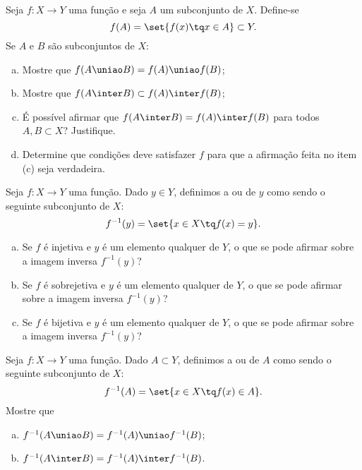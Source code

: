 \begin{exercise}
    Seja $f: X \to Y$ uma função e seja $A$ um subconjunto de $X$.
Define-se $$f(A) = \set{f(x) \tq x\in A} \subset Y.$$ Se $A$ e $B$
são subconjuntos de $X$:
\begin{enumerate}[(a)]
  \item Mostre que $f(A \uniao B) = f(A) \uniao f(B)$;
  \item Mostre que $f(A \inter B) \subset f(A) \inter f(B)$;
  \item É possível afirmar que $f(A \inter B) = f(A) \inter f(B)$ para
  todos $A, B \subset X$? Justifique.
  \item Determine que condições deve satisfazer $f$ para que a
  afirmação feita no item (c) seja verdadeira.
\end{enumerate}

\end{exercise}

\begin{exercise}
    Seja $f: X \to Y$ uma função. Dado $y \in Y$, definimos a
 ou  de $y$ como sendo o
seguinte subconjunto de $X$: $$ f^{-1}(y) = \set{x \in X \tq
f(x)=y}.$$
\begin{enumerate}[(a)]
  \item Se $f$ é injetiva e $y$ é um elemento qualquer de $Y$, o que
  se pode afirmar sobre a imagem inversa $f^{-1}(y)$?
  \item Se $f$ é sobrejetiva e $y$ é um elemento qualquer de $Y$, o que
  se pode afirmar sobre a imagem inversa $f^{-1}(y)$?
  \item Se $f$ é bijetiva e $y$ é um elemento qualquer de $Y$, o que
  se pode afirmar sobre a imagem inversa $f^{-1}(y)$?
\end{enumerate}
\end{exercise}

\begin{exercise}
    Seja $f: X \to Y$ uma função. Dado $A \subset Y$, definimos a
 ou  de $A$ como sendo o
seguinte subconjunto de $X$: $$ f^{-1}(A) = \set{x \in X \tq f(x)\in
A}.$$ Mostre que
\begin{enumerate}[(a)]
  \item $f^{-1} (A \uniao B) = f^{-1} (A) \uniao f^{-1} (B)$;
  \item $f^{-1} (A \inter B) = f^{-1} (A) \inter f^{-1} (B)$.
\end{enumerate}
\end{exercise}


